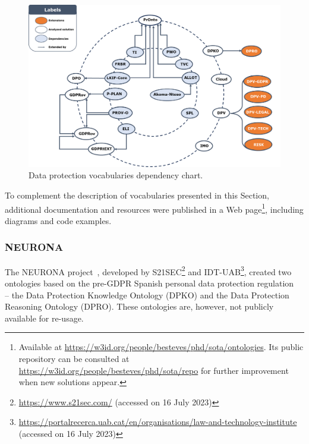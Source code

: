 \begin{figure}[ht]
\centering
\includegraphics[width=\textwidth]{figures/chapter-2/vocabs.png}
\caption{Data protection vocabularies dependency chart.}
\label{fig:voc_dependency_graph}
\end{figure}

To complement the description of vocabularies presented in this Section, additional documentation and resources were published in a Web page\footnote{Available at \url{https://w3id.org/people/besteves/phd/sota/ontologies}. Its public repository can be consulted at \url{https://w3id.org/people/besteves/phd/sota/repo} for further improvement when new solutions appear.}, including diagrams and code examples.

\subsubsection{NEURONA}
\label{sec:neurona}

The NEURONA project~\citep{casellas_ontological_2010}, developed by S21SEC\footnote{\url{https://www.s21sec.com/} (accessed on 16 July 2023)} and IDT-UAB\footnote{\url{https://portalrecerca.uab.cat/en/organisations/law-and-technology-institute} (accessed on 16 July 2023)}, created two ontologies based on the pre-GDPR Spanish personal data protection regulation~\citeyearpar{noauthor_real_2008} -- the Data Protection Knowledge Ontology (DPKO) and the Data Protection Reasoning Ontology (DPRO).
These ontologies are, however, not publicly available for re-usage.

